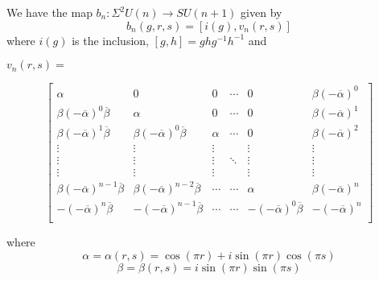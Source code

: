 \documentclass{slides}
\begin{document}
\begin{slide}{}

We have the map
	$ b_n: \Sigma^2U(n) \rightarrow SU(n+1) $ \newline
given by
	\[ b_n(g, r, s) = \left[ i(g), v_n(r, s) \right] \]
where $i(g)$ is the inclusion,
	$\left[g, h\right] = ghg^{-1}h^{-1}$ \newline
and

$ v_n(r,s) = $

{\small
\[
\left[ \begin{array}{cccccc}
	\alpha & 0 & 0 & \cdots & 0 & \beta (-\overline{\alpha})^0 \\
	\beta (-\overline{\alpha})^0\overline{\beta} &
	   \alpha  &  0  & \cdots & 0 &
	   \beta (-\overline{\alpha})^1 \\
	\beta (-\overline{\alpha})^1\overline{\beta} &
	   \beta (-\overline{\alpha})^0\overline{\beta} &
	   \alpha & \cdots & 0 & \beta (-\overline{\alpha})^2 \\
	\vdots & \vdots & \vdots &  & \vdots & \vdots \\
	\vdots & \vdots & \vdots & \ddots & \vdots & \vdots \\
	\vdots & \vdots & \vdots &  & \vdots & \vdots \\
	\beta (-\overline{\alpha})^{n-1}\overline{\beta} &
	   \beta (-\overline{\alpha})^{n-2}\overline{\beta} &
	   \cdots &  \cdots & \alpha &
	   \beta (-\overline{\alpha})^n \\
	-(-\overline{\alpha})^n\overline{\beta} &
	   -(-\overline{\alpha})^{n-1}\overline{\beta} &
	   \cdots &  \cdots & -(-\overline{\alpha})^0 
	   \overline{\beta} & -(-\overline{\alpha})^n \\
	\end{array} \right]
\]
}

{\small
where
\[ \alpha = \alpha(r,s) =
	\cos(\pi r) + i \sin(\pi r)\cos(\pi s) \]
\[ \beta = \beta(r,s) = i \sin(\pi r)\sin(\pi s) \]
}

\end{slide}
\end{document}
